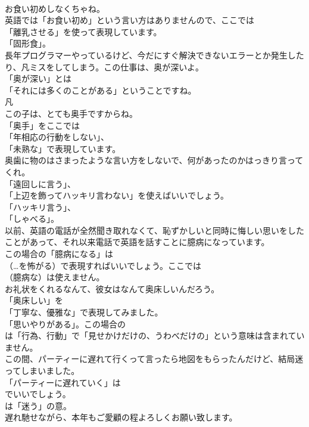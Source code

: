 \documentclass[8pt]{extreport}
\begin{document}
\begin{CJK}{UTF8}{min}
\\	お食い初めしなくちゃね。 
\\	英語では「お食い初め」という言い方はありませんので、ここでは
\\	「離乳させる」を使って表現しています。
\\	「固形食」。	
\\	長年プログラマーやっているけど、今だにすぐ解決できないエラーとか発生したり、凡ミスをしてしまう。この仕事は、奥が深いよ。 
\\	「奥が深い」とは
\\	「それには多くのことがある」ということですね。	
\\	凡
\\	この子は、とても奥手ですからね。 
\\	「奥手」をここでは
\\	「年相応の行動をしない」、
\\	「未熟な」で表現しています。	
\\	奥歯に物のはさまったような言い方をしないで、何があったのかはっきり言ってくれ。 
\\	「遠回しに言う」、
\\	「上辺を飾ってハッキリ言わない」を使えばいいでしょう。
\\	「ハッキリ言う」、
\\	「しゃべる」。	
\\	以前、英語の電話が全然聞き取れなくて、恥ずかしいと同時に悔しい思いをしたことがあって、それ以来電話で英語を話すことに臆病になっています。 
\\	この場合の「臆病になる」は
\\	（…を怖がる）で表現すればいいでしょう。ここでは
\\	（臆病な）は使えません。	
\\	お礼状をくれるなんて、彼女はなんて奥床しいんだろう。 
\\	「奥床しい」を
\\	「丁寧な、優雅な」で表現してみました。
\\	「思いやりがある」。この場合の
\\	は「行為、行動」で「見せかけだけの、うわべだけの」という意味は含まれていません。	
\\	この間、パーティーに遅れて行くって言ったら地図をもらったんだけど、結局迷ってしまいました。 
\\	「パーティーに遅れていく」は
\\	でいいでしょう。
\\	は「迷う」の意。	
\\	遅れ馳せながら、本年もご愛顧の程よろしくお願い致します。 

\end{CJK}
\end{document}
